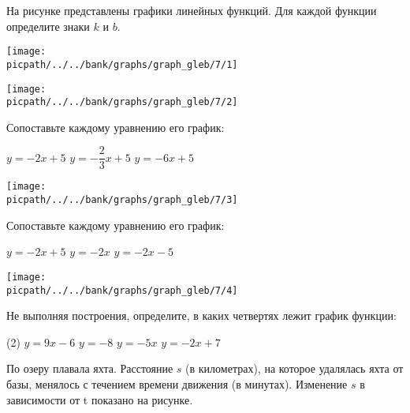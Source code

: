 
\begin{class}[number=1]
	\begin{listofex}
		\item На рисунке представлены графики линейных функций. Для каждой функции определите знаки \(k\) и \(b\). \\
		\begin{minipage}[t]{0.45\linewidth}
			\texttt{[image: \\picpath/../../bank/graphs/graph\_gleb/7/1]}
		\end{minipage}
		\gapwidth
		\begin{minipage}[t]{0.45\linewidth}
			\texttt{[image: \\picpath/../../bank/graphs/graph\_gleb/7/2]}
		\end{minipage}
		\item 
		\begin{minipage}[t]{\bodywidth}
			Сопоставьте каждому уравнению его график:
			\begin{tasks}
				\task \( y=-2x+5 \)
				\task \( y=-\dfrac{ 2 }{ 3 }x+5 \)
				\task \( y=-6x+5 \)
			\end{tasks}
		\end{minipage}
		\gapwidth
		\begin{minipage}[t]{\picwidth}
			\texttt{[image: \\picpath/../../bank/graphs/graph\_gleb/7/3]}
		\end{minipage}
		\item 
		\begin{minipage}[t]{\bodywidth}
			Сопоставьте каждому уравнению его график:
			\begin{tasks}
				\task \( y=-2x+5 \)
				\task \( y=-2x \)
				\task \( y=-2x-5 \)
			\end{tasks}
		\end{minipage}
		\gapwidth
		\begin{minipage}[t]{\picwidth}
			\texttt{[image: \\picpath/../../bank/graphs/graph\_gleb/7/4]}
		\end{minipage}
		\item Не выполняя построения, определите, в каких четвертях лежит график
		функции:
		\begin{tasks}(2)
			\task \( y=9x-6 \)
			\task \( y=-8 \)
			\task \( y=-5x \)
			\task \( y=-2x+7 \)
		\end{tasks}
		\item По озеру плавала яхта. Расстояние \(s\) (в километрах), на которое удалялась яхта от базы, менялось с течением времени движения (в минутах). Изменение \(s\) в зависимости от t показано на рисунке. 

\end{listofex}
\end{class}
